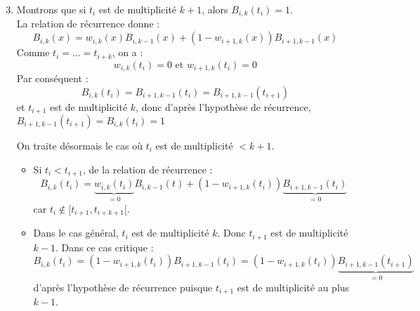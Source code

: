 \begin{dem}
\begin{enumerate}
\setcounter{enumi}{2}
\item Montrons que si $t_i$ est de multiplicité $k+1$, alors $B_{i,k}(t_i)=1$. \\
La relation de récurrence donne :
\[B_{i,k}(x)=w_{i,k}(x)B_{i,k-1}(x)+(1-w_{i+1,k}(x))B_{i+1,k-1}(x)\]
Comme $t_i=...=t_{i+k}$, on a :
	\[w_{i,k}(t_i)=0 \text{ et } w_{i+1,k}(t_i)=0\]
Par conséquent : 
\[B_{i,k}(t_i)=B_{i+1,k-1}(t_i)=B_{i+1,k-1}(t_{i+1})\]
et $t_{i+1}$ est de multiplicité $k$, donc d'après l'hypothèse de récurrence, $B_{i+1,k-1}(t_{i+1})=B_{i,k}(t_i)=1$

\bigskip
On traite désormais le cas où $t_i$ est de multiplicité $<k+1$.
\begin{itemize}
	\item Si $t_i<t_{i+1}$, de la relation de récurrence : 
		\[B_{i,k}(t_i)=\underbrace{w_{i,k}(t_i)}_{=0}B_{i,k-1}(t)+(1-w_{i+1,k}(t_i))\underbrace{B_{i+1,k-1}(t_i)}_{=0}\]
car $t_i\not\in[t_{i+1},t_{i+k+1}[$.
	\item Dans le cas général, $t_i$ est de multiplicité $k$. Donc $t_{i+1}$ est de multiplicité $k-1$. Dans ce cas critique : 
		\[B_{i,k}(t_i)=(1-w_{i+1,k}(t_i))B_{i+1,k-1}(t_i) = (1-w_{i+1,k}(t_i))\underbrace{B_{i+1,k-1}(t_{i+1})}_{=0}\]
d'après l'hypothèse de récurrence puisque $t_{i+1}$ est de multiplicité au plus $k-1$.
\end{itemize}

\end{enumerate}
\end{dem}
